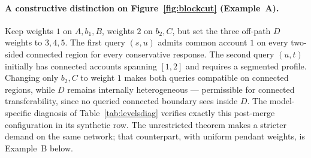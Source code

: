 \paragraph{A constructive distinction on Figure~\ref{fig:blockcut}
(Example~A).}
Keep weights $1$ on $A,b_1,B$, weights $2$ on $b_2,C$, but set the three
off-path $D$ weights to $3,4,5$. The first query $(s,u)$ admits common
account $1$ on every two-sided connected region for every conservative
response. The second query $(u,t)$ initially has connected accounts
spanning $[1,2]$ and requires a segmented profile. Changing only
$b_2,C$ to weight $1$ makes both queries compatible on connected
regions, while $D$ remains internally heterogeneous --- permissible
for connected transferability, since no queried connected boundary
sees inside $D$. The model-specific diagnosis of
Table~\ref{tab:levelsdiag} verifies exactly this post-merge
configuration in its synthetic row. The unrestricted theorem makes a
stricter demand on the same network; that counterpart, with uniform
pendant weights, is Example~B below.
